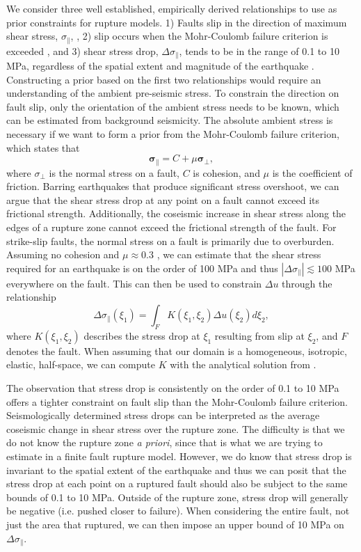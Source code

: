\documentclass[12pt]{article}
\begin{document}
We consider three well established, empirically derived relationships to use as prior constraints for rupture models. 1) Faults slip in the direction of maximum shear stress, $\sigma_\parallel$, \citep{Wallace1951}, 2) slip occurs when the Mohr-Coulomb failure criterion is exceeded \citep{Byerlee1978}, and 3) shear stress drop, $\Delta \sigma_\parallel$, tends to be in the range of 0.1 to 10 MPa, regardless of the spatial extent and magnitude of the earthquake \citep{Kanamori1975}.  Constructing a prior based on the first two relationships would require an understanding of the ambient pre-seismic stress.  To constrain the direction on fault slip, only the orientation of the ambient stress needs to be known, which can be estimated from background seismicity.  The absolute ambient stress is necessary if we want to form a prior from the Mohr-Coulomb failure criterion, which states that
\begin{equation}\label{eq:MohrCoulomb}
  \mathbf{\sigma_\parallel} = C + \mu \mathbf{\sigma_\bot},
\end{equation}
where $\sigma_\bot$ is the normal stress on a fault, $C$ is cohesion, and $\mu$ is the coefficient of friction.  Barring earthquakes that produce significant stress overshoot, we can argue that the shear stress drop at any point on a fault cannot exceed its frictional strength.  Additionally, the coseismic increase in shear stress along the edges of a rupture zone cannot exceed the frictional strength of the fault.  For strike-slip faults, the normal stress on a fault is primarily due to overburden.  Assuming no cohesion and $\mu\approx0.3$ \citep{Carpenter2011}, we can estimate that the shear stress required for an earthquake is on the order of 100 MPa and thus $|\Delta\sigma_\parallel|\lesssim 100 $ MPa everywhere on the fault.  This can then be used to constrain $\Delta u$ through the relationship
\begin{equation}\label{eq:StressSlip}
  \Delta \sigma_\parallel (\xi_1) = \int_F K(\xi_1,\xi_2) \Delta u(\xi_2) d\xi_2,
\end{equation}
where $K(\xi_1,\xi_2)$ describes the stress drop at $\xi_1$ resulting from slip at $\xi_2$, and $F$ denotes the fault.  When assuming that our domain is a homogeneous, isotropic, elastic, half-space, we can compute $K$ with the analytical solution from \citet{Okada1992}.  

The observation that stress drop is consistently on the order of 0.1 to 10 MPa offers a tighter constraint on fault slip than the Mohr-Coulomb failure criterion.  Seismologically determined stress drops can be interpreted as the average coseismic change in shear stress over the rupture zone.  The difficulty is that we do not know the rupture zone \textit{a priori}, since that is what we are trying to estimate in a finite fault rupture model.  However, we do know that stress drop is invariant to the spatial extent of the earthquake and thus we can posit that the stress drop at each point on a ruptured fault should also be subject to the same bounds of 0.1 to 10 MPa.  Outside of the rupture zone, stress drop will generally be negative (i.e. pushed closer to failure).  When considering the entire fault, not just the area that ruptured, we can then impose an upper bound of 10 MPa on $\Delta \sigma_\parallel$.  
\end{document}
